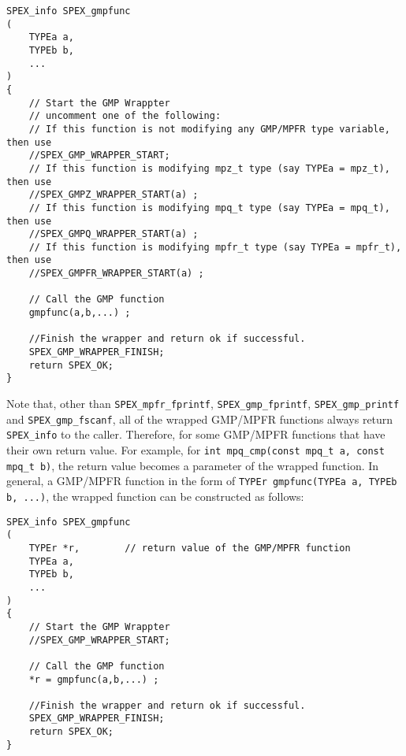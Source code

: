 \documentclass[12pt]{report}
\theoremstyle{definition}
\begin{document}
\newpage
\begin{mdframed}[userdefinedwidth=6in]
{\footnotesize
\begin{verbatim}
SPEX_info SPEX_gmpfunc
(
    TYPEa a,
    TYPEb b,
    ...
)
{
    // Start the GMP Wrappter
    // uncomment one of the following:
    // If this function is not modifying any GMP/MPFR type variable, then use
    //SPEX_GMP_WRAPPER_START;
    // If this function is modifying mpz_t type (say TYPEa = mpz_t), then use
    //SPEX_GMPZ_WRAPPER_START(a) ;
    // If this function is modifying mpq_t type (say TYPEa = mpq_t), then use
    //SPEX_GMPQ_WRAPPER_START(a) ;
    // If this function is modifying mpfr_t type (say TYPEa = mpfr_t), then use
    //SPEX_GMPFR_WRAPPER_START(a) ;

    // Call the GMP function
    gmpfunc(a,b,...) ;

    //Finish the wrapper and return ok if successful.
    SPEX_GMP_WRAPPER_FINISH;
    return SPEX_OK;
}
\end{verbatim}
} \end{mdframed}

Note that, other than \verb|SPEX_mpfr_fprintf|, \verb|SPEX_gmp_fprintf|,
\verb|SPEX_gmp_printf| and \verb|SPEX_gmp_fscanf|, all of the wrapped GMP/MPFR
functions always return \verb|SPEX_info| to the caller. Therefore, for some
GMP/MPFR functions that have their own return value.  For example, for
\verb|int mpq_cmp(const mpq_t a, const mpq_t b)|, the return value becomes a
parameter of the wrapped function. In general, a GMP/MPFR function in the form
of \verb|TYPEr gmpfunc(TYPEa a, TYPEb b, ...)|, the wrapped
function can be constructed as follows:

\begin{mdframed}[userdefinedwidth=6in]
{\footnotesize
\begin{verbatim}
SPEX_info SPEX_gmpfunc
(
    TYPEr *r,        // return value of the GMP/MPFR function
    TYPEa a,
    TYPEb b,
    ...
)
{
    // Start the GMP Wrappter
    //SPEX_GMP_WRAPPER_START;

    // Call the GMP function
    *r = gmpfunc(a,b,...) ;

    //Finish the wrapper and return ok if successful.
    SPEX_GMP_WRAPPER_FINISH;
    return SPEX_OK;
}
\end{verbatim}
} \end{mdframed}
\end{document}
